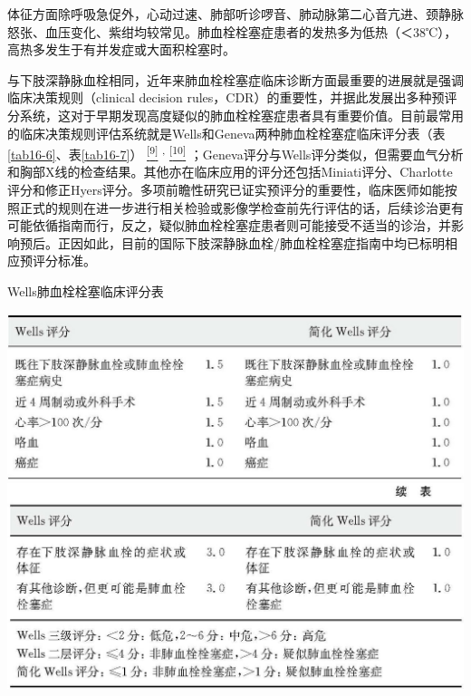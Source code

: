 体征方面除呼吸急促外，心动过速、肺部听诊啰音、肺动脉第二心音亢进、颈静脉怒张、血压变化、紫绀均较常见。肺血栓栓塞症患者的发热多为低热（＜38℃），高热多发生于有并发症或大面积栓塞时。

与下肢深静脉血栓相同，近年来肺血栓栓塞症临床诊断方面最重要的进展就是强调临床决策规则（clinical
decision
rules，CDR）的重要性，并据此发展出多种预评分系统，这对于早期发现高度疑似的肺血栓栓塞症患者具有重要价值。目前最常用的临床决策规则评估系统就是Wells和Geneva两种肺血栓栓塞症临床评分表（表\ref{tab16-6}、表\ref{tab16-7}）
\protect\hyperlink{text00022.htmlux5cux23ch9-21}{\textsuperscript{{[}9{]}}}
\textsuperscript{,}
\protect\hyperlink{text00022.htmlux5cux23ch10-21}{\textsuperscript{{[}10{]}}}
；Geneva评分与Wells评分类似，但需要血气分析和胸部X线的检查结果。其他亦在临床应用的评分还包括Miniati评分、Charlotte评分和修正Hyers评分。多项前瞻性研究已证实预评分的重要性，临床医师如能按照正式的规则在进一步进行相关检验或影像学检查前先行评估的话，后续诊治更有可能依循指南而行，反之，疑似肺血栓栓塞症患者则可能接受不适当的诊治，并影响预后。正因如此，目前的国际下肢深静脉血栓/肺血栓栓塞症指南中均已标明相应预评分标准。

\begin{table}[htbp]
\centering
\caption{Wells肺血栓栓塞临床评分表}
\label{tab16-6}
\includegraphics[width=\textwidth,height=\textheight,keepaspectratio]{./images/Image00122.jpg}
\includegraphics[width=\textwidth,height=\textheight,keepaspectratio]{./images/Image00123.jpg}
\end{table}

